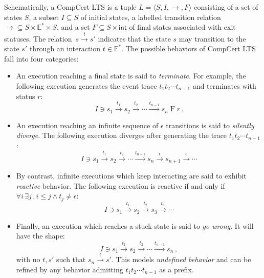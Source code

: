 \documentclass[sigplan,10pt,review,anonymous]{acmart}
\newcommand{\kw}[1]{\ensuremath{ \mathsf{#1} }}
\begin{document}
Schematically, a CompCert LTS
is a tuple
$L = \langle S, I, {\rightarrow}, F \rangle$
consisting of
a set of states $S$,
a subset $I \subseteq S$ of initial states,
a labelled transition relation
${\rightarrow} \subseteq S \times \mathbb{E}^* \times S$,
and a set
$F \subseteq S \times \kw{int}$
of final states associated with exit statuses.
The relation~$s \stackrel{t}{\rightarrow} s'$
indicates that the state $s$ may transition to the state $s'$
through an interaction $t \in \mathbb{E}^*$.
The possible behaviors of CompCert LTS fall into four categories:
\begin{itemize}
\item An execution reaching a final state is said to
    \emph{terminate}.
    For example,
    the following execution generates
    the event trace $t_1 t_2 \cdots t_{n-1}$
    and terminates with status $r$:
    \[
        I \ni s_1 \stackrel{t_1}{\rightarrow}
          s_2 \stackrel{t_2}{\rightarrow}
          \cdots \stackrel{t_{n-1}}{\rightarrow}
          s_n \mathrel{F} r \,.
    \]
\item An execution reaching
    an infinite sequence of $\epsilon$ transitions
    is said to \emph{silently diverge}.
    The following execution diverges after
    generating the trace $t_1 t_2 \cdots t_{n-1}$:
    \[
        I \ni s_1 \stackrel{t_1}{\rightarrow}
          s_2 \stackrel{t_2}{\rightarrow}
          \cdots \stackrel{t_{n-1}}{\rightarrow}
          s_n \stackrel{\epsilon}{\rightarrow}
          s_{n+1} \stackrel{\epsilon}{\rightarrow}
          \cdots
    \]
\item By contrast,
    infinite executions which keep interacting
    are said to exhibit \emph{reactive} behavior.
    The following execution
    is reactive if and only if
    $\forall i \, \exists j \,.\, i \le j \wedge t_j \ne \epsilon$:
    \[
        I \ni s_1 \stackrel{t_1}{\rightarrow}
          s_2 \stackrel{t_2}{\rightarrow}
          s_3 \stackrel{t_3}{\rightarrow}
          \cdots
    \]
\item Finally, an execution which reaches a stuck state
    is said to \emph{go wrong}. It will have the shape:
    \[
        I \ni s_1 \stackrel{t_1}{\rightarrow}
          s_2 \stackrel{t_2}{\rightarrow}
          \cdots \stackrel{t_{n-1}}{\rightarrow}
          s_n \,,
    \]
    with no $t, s'$ such that
    $s_n \stackrel{t}{\rightarrow} s'$.
    This models \emph{undefined behavior}
    and can be refined by any behavior
    admitting $t_1 t_2 \cdots t_{n-1}$ as a prefix.
\end{itemize}
\end{document}
